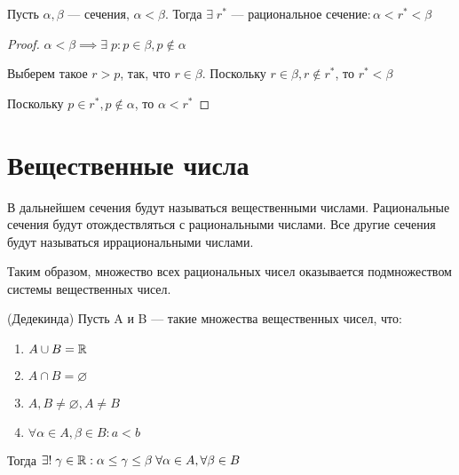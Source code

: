 \begin{theorem}
    Пусть $\alpha, \beta$ --- сечения, $\alpha < \beta$. Тогда $\exists \; r^* \text{ --- рациональное сечение}: \alpha< r^* < \beta$
\end{theorem}

\begin{proof}
    $\alpha < \beta \implies \exists \; p: p \in \beta, p \notin \alpha$

    Выберем такое $r > p$, так, что $r \in \beta$. Поскольку $r \in \beta, r \notin r^*$, то $r^* < \beta$

    Поскольку $p \in r^*, p \notin \alpha$, то $ \alpha < r^*$
\end{proof}

\chapter{Вещественные числа}

\begin{definition}
    В дальнейшем сечения будут называться вещественными числами. Рациональные сечения будут отождествляться с рациональными числами. Все другие сечения будут называться иррациональными числами.

    Таким образом, множество всех рациональных чисел оказывается подмножеством системы вещественных чисел.
\end{definition}

\begin{theorem} (Дедекинда)
    Пусть A и B --- такие множества вещественных чисел, что:
    \begin{enumerate}
        \item $A \cup B = \mathbb{R}$
        \item $A \cap B = \varnothing$
        \item $A, B \neq \varnothing, A \neq B$
        \item $\forall \alpha \in A, \beta \in B: a < b$
    \end{enumerate}

    Тогда $\exists! \; \gamma \in \mathbb{R}: \alpha \leq \gamma \leq \beta \; \forall \alpha \in A, \forall \beta \in B$
\end{theorem}

